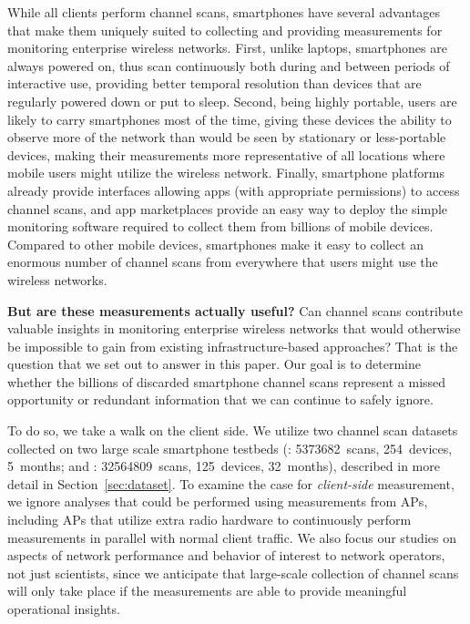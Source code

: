 While all \wifi{} clients perform channel scans, smartphones have several
advantages that make them uniquely suited to collecting and providing
measurements for monitoring enterprise wireless networks. First, unlike laptops,
smartphones are always powered on, thus scan continuously both during and
between periods of interactive use, providing better temporal resolution than
devices that are regularly powered down or put to sleep. Second, being highly portable, users
are likely to carry smartphones most of the time, giving these devices
the ability to observe more of the network than would be seen by stationary or
less-portable devices, making their measurements more representative of all
locations where mobile users might utilize the wireless network. Finally,
smartphone platforms already provide interfaces allowing apps (with appropriate
permissions) to access channel scans, and app marketplaces provide an easy way
to deploy the simple monitoring software required to collect them from billions of
mobile devices. Compared to other mobile devices, smartphones make it easy to
collect an enormous number of channel scans from everywhere that users might use
the wireless networks.

\textbf{But are these measurements actually useful?} Can channel scans contribute
valuable insights in monitoring enterprise wireless networks that would
otherwise be impossible to gain from existing infrastructure-based approaches?
That is the question that we set out to answer in this paper. Our goal is to
determine whether the billions of discarded smartphone channel scans represent a
missed opportunity or redundant information that we can continue to safely
ignore.

To do so, we take a walk on the client side. We utilize two \wifi{} channel scan
datasets collected on two large scale smartphone testbeds (\PhoneLab{}:
\num{5373682}~scans, 254~devices, 5~months; and \NetSense{}:
\num{32564809}~scans, 125~devices, 32~months), described in more detail in
Section~\ref{sec:dataset}. To examine the case for \textit{client-side}
measurement, we ignore analyses that could be performed using measurements from
APs, including APs that utilize extra radio hardware to
continuously perform measurements in parallel with normal client traffic. We
also focus our studies on aspects of network performance and behavior of
interest to network operators, not just scientists, since we anticipate that
large-scale collection of channel scans will only take place if the measurements
are able to provide meaningful operational insights.

